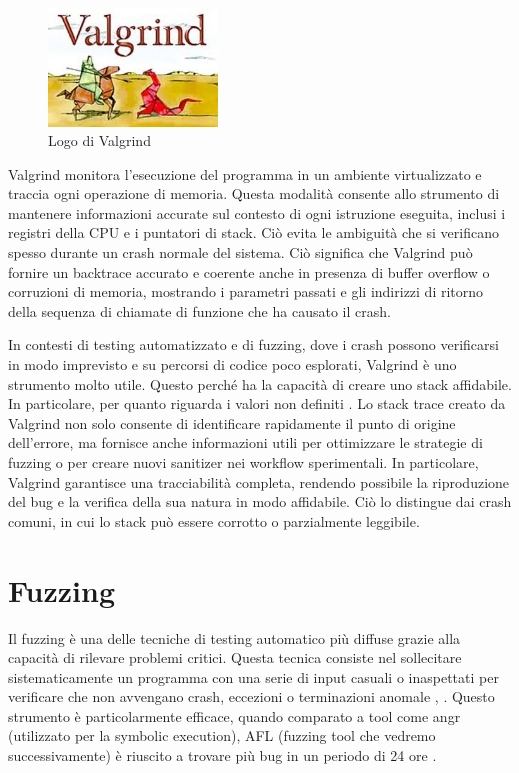 \begin{figure}[htbp]        
  \centering               
  \includegraphics[width=0.4\textwidth]{immagini/valgrind.jpg}  
  \caption{Logo di Valgrind}  
  \label{fig:valgrind}      
\end{figure}

Valgrind monitora l'esecuzione del programma in un ambiente virtualizzato e traccia ogni operazione di memoria. Questa modalità consente allo strumento di mantenere informazioni accurate sul contesto di ogni istruzione eseguita, inclusi i registri della CPU e i puntatori di stack. Ciò evita le ambiguità che si verificano spesso durante un crash normale del sistema. Ciò significa che Valgrind può fornire un backtrace accurato e coerente anche in presenza di buffer overflow o corruzioni di memoria, mostrando i parametri passati e gli indirizzi di ritorno della sequenza di chiamate di funzione che ha causato il crash.

In contesti di testing automatizzato e di fuzzing, dove i crash possono verificarsi in modo imprevisto e su percorsi di codice poco esplorati, Valgrind è uno strumento molto utile. Questo perché ha la capacità di creare uno stack affidabile. In particolare, per quanto riguarda i valori non definiti \cite{ref10}. Lo stack trace creato da Valgrind non solo consente di identificare rapidamente il punto di origine dell'errore, ma fornisce anche informazioni utili per ottimizzare le strategie di fuzzing o per creare nuovi sanitizer nei workflow sperimentali. In particolare, Valgrind garantisce una tracciabilità completa, rendendo possibile la riproduzione del bug e la verifica della sua natura in modo affidabile. Ciò lo distingue dai crash comuni, in cui lo stack può essere corrotto o parzialmente leggibile.

\section{Fuzzing}

Il fuzzing è una delle tecniche di testing automatico più diffuse grazie alla capacità di rilevare problemi critici. Questa tecnica consiste nel sollecitare sistematicamente un programma con una serie di input casuali o inaspettati per verificare che non avvengano crash, eccezioni o terminazioni anomale \cite{ref17}, \cite{ref20}.  Questo strumento è particolarmente efficace, quando comparato a tool come angr (utilizzato per la symbolic execution), AFL (fuzzing tool che vedremo successivamente) è riuscito a trovare più bug in un periodo di 24 ore \cite{ref29}.

